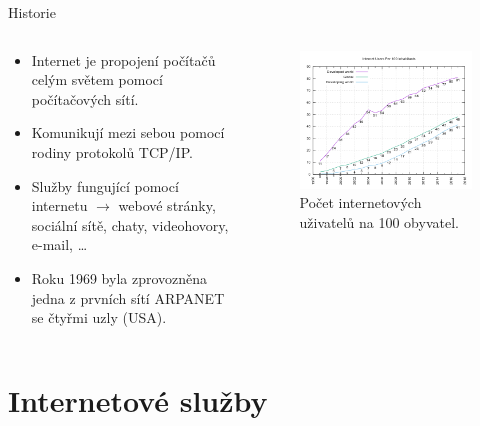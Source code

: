 \documentclass[aspectratio=169,xcolor=dvipsnames, t]{beamer}
\begin{document}
\begin{frame}{Historie}
    \vspace{-0.5cm}
    \begin{columns}
    \begin{column}{0.45\textwidth}
    \begin{itemize}
        \item Internet je propojení počítačů celým světem pomocí počítačových sítí. 
        \item Komunikují mezi sebou pomocí rodiny protokolů TCP/IP.
        \item Služby fungující pomocí internetu $\rightarrow$ webové stránky, sociální sítě, chaty, videohovory, e-mail, \ldots
        \item Roku 1969 byla zprovozněna jedna z prvních sítí ARPANET se čtyřmi uzly (USA).
    \end{itemize}
\end{column}
\begin{column}{0.45\textwidth}
    \begin{figure}
        \includegraphics[width=\textwidth]{Internet_users_per_100_inhabitants_ITU}
        \caption{Počet internetových uživatelů na 100 obyvatel.}
    \end{figure}
\end{column}
\end{columns}
\end{frame}

\section{Internetové služby}
\end{document}
